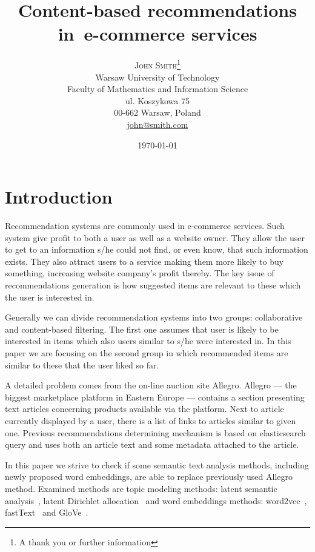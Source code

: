 \documentclass[twoside,twocolumn]{article}
\title{Content-based recommendations in~e-commerce services} %
\author{%
	\textsc{John Smith}\thanks{A thank you or further information} \\[1ex] %
	\normalsize Warsaw University of Technology \\ %
	\normalsize Faculty of Mathematics and Information Science \\
	\normalsize ul. Koszykowa 75 \\
	\normalsize 00-662 Warsaw, Poland \\
	\normalsize \href{mailto:john@smith.com}{john@smith.com} %
}
\date{\today} %
\begin{document}
	\maketitle
	\section{Introduction}
	
	Recommendation systems are commonly used in e-commerce services. Such system give profit to both a user as well as a website owner. They allow the user to get to an information s/he could not find, or even know, that such information exists. They also attract users to a service making them more likely to buy something, increasing website company's profit thereby. The key issue of recommendations generation is how suggested items are relevant to these which the user is interested in. 
	
	Generally we can divide recommendation systems into two groups: collaborative and content-based filtering. The first one assumes that user is likely to be interested in items which also users similar to s/he were interested in. In this paper we are focusing on the second group in which recommended items are similar to these that the user liked so far.
	
	A detailed problem comes from the on-line auction site Allegro. Allegro --- the biggest marketplace platform in Eastern Europe --- contains a section presenting text articles concerning products available via the platform. Next to article currently displayed by a user, there is a list of links to articles similar to given one. Previous recommendations determining mechanism is based on elasticsearch query and uses both an article text and some metadata attached to the article.
	
	In this paper we strive to check if some semantic text analysis methods, including newly proposed word embeddings, are able to replace previously used Allegro method. Examined methods are topic modeling methods: latent semantic analysis~\cite{lsa}, latent Dirichlet allocation~\cite{lda} and word embeddings methods: word2vec~\cite{word2vec}, fastText~\cite{fasttext} and GloVe~\cite{glove}.
	
\end{document}
